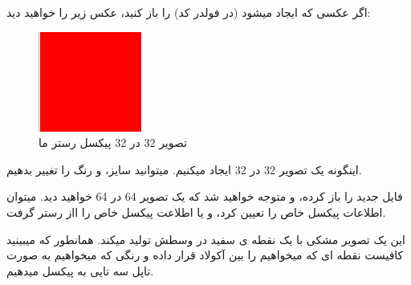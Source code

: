 \documentclass[14pt,a4paper]{memoir}
\begin{document}
	
	اگر عکسی که ایجاد میشود (در فولدر کد) را باز کنید، عکس زیر را خواهید دید:
	
	\begin{figure}[H]
		\centering
		\includegraphics[scale=1]{RedImage}		
		\caption{تصویر 32 در 32 پیکسل رستر ما}
	
	\end{figure}

اینگونه یک تصویر 32 در 32 ایجاد میکنیم. میتوانید سایز، و رنگ را تغییر بدهیم.
	
	
	
			 	 	 	 \begin{latin}
		
	\end{latin}
	
	فایل جدید را باز کرده، و متوجه خواهید شد که یک تصویر 64 در 64 خواهید دید. 
	میتوان اطلاعات پیکسل خاص را تعیین کرد، و یا اطلاعت پیکسل خاص را ااز رستر گرفت.
	
	
	
				 	 	 	 \begin{latin}
		
		
	\end{latin}
	
	
	این یک تصویر مشکی با یک نقطه ی سفید در وسطش تولید میکند. همانطور که میبینید کافیست نقطه ای که میخواهیم را بین آکولاد قرار داده و رنگی که میخواهیم به صورت تاپل سه تایی به پیکسل میدهیم.
	
\end{document}
